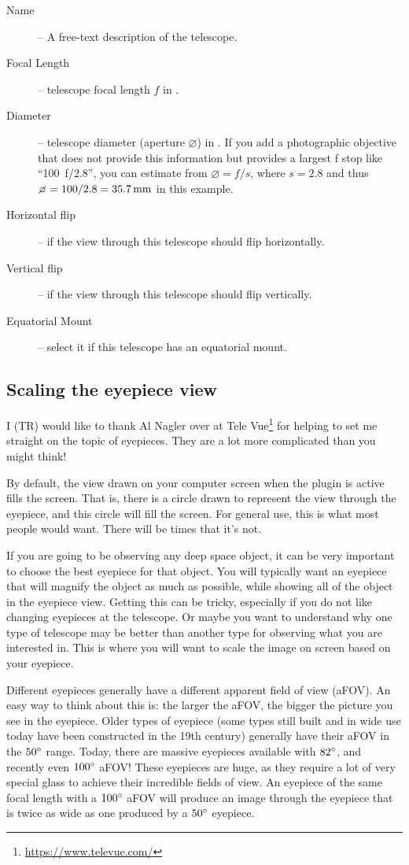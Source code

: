 \begin{description}
\item[Name] -- A free-text description of the telescope. 
\item[Focal Length] -- telescope focal length $f$ in \mm.
\item[Diameter] -- telescope diameter (aperture $\diameter$) in \mm. If you add a photographic objective 
that does not provide this information but provides a largest f stop like ``100\mm~f/2.8'', you can estimate from $\diameter=f/s$, 
where $s=2.8$ and thus $\diameter=100/2.8=35.7\mm$ in this example.
\item[Horizontal flip] -- if the view through this telescope should flip horizontally.
\item[Vertical flip] -- if the view through this telescope should flip vertically.
\item[Equatorial Mount] -- select it if this telescope has an equatorial mount.
\end{description}

\subsection{Scaling the eyepiece view}
\label{sec:sec:plugins:Oculars:ScalingTheEyepieceView}
I (TR) would like to thank Al Nagler over at Tele Vue\footnote{\url{https://www.televue.com/}} for helping to set me straight on the topic of eyepieces. They are a lot more complicated than you might think!

By default, the view drawn on your computer screen when the plugin is active fills the screen. That is, there is a circle drawn to represent the view through the eyepiece, and this circle will fill the screen. For general use, this is what most people would want. There will be times that it's not.

If you are going to be observing any deep space object, it can be very important to choose the best eyepiece for that object. You will typically want an eyepiece that will magnify the object as much as possible, while showing all of the object in the eyepiece view. Getting this can be tricky, especially if you do not like changing eyepieces at the telescope. Or maybe you want to understand why one type of telescope may be better than another type for observing what you are interested in. This is where you will want to scale the image on screen based on your eyepiece.

Different eyepieces generally have a different apparent field of view (aFOV). An easy way to think about this is: the larger the aFOV, the bigger the picture you see in the eyepiece. 
Older types of eyepiece (some types still built and in wide use today have been constructed in the 19th century) generally have their aFOV in the $50\degree$ range. 
Today, there are massive eyepieces available with $82\degree$, and recently even $100\degree$ aFOV! 
These eyepieces are huge, as they require a lot of very special glass to achieve their incredible fields of view. 
An eyepiece of the same focal length with a $100\degree$ aFOV will produce an image through the eyepiece that is twice as wide as one produced by a $50\degree$ eyepiece.

